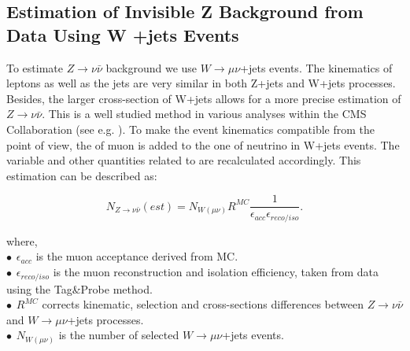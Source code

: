 \subsection{Estimation of Invisible Z Background from Data Using W +jets Events}
\label{sect:znunu}
To estimate $Z\rightarrow\nu\bar{\nu}$ background we use $W\rightarrow\mu\nu$+jets events. The kinematics of leptons as well as the jets are very similar in both Z+jets and W+jets processes. Besides, the larger cross-section of W+jets allows for a more precise estimation of
$Z\rightarrow\nu\bar{\nu}$.  This is a well studied method in various analyses within the CMS Collaboration (see e.g. \cite{CMS-PAS-SUS-08-002,CMS-PAS-SUS-10-001,CMS-PAS-SUS-11-005}).
To make the event kinematics compatible from the \met point of view, the \pT of muon is added to the one of neutrino in W+jets events. The \mttwo variable and other quantities related to \met are recalculated accordingly.
This estimation can be described as:

\begin{linenomath}
\begin{equation}
\label{eq:ZinvEst}
N_{Z\rightarrow\nu\bar{\nu}}(est) = N_{W (\mu\nu)} R^{MC} \frac{1}{\epsilon_{acc}\epsilon_{reco/iso}}.
\end{equation}
\end{linenomath}
where,\\
$\bullet \hspace{5pt} \epsilon_{acc}$ is the muon acceptance derived from MC.\\
$\bullet \hspace{5pt} \epsilon_{reco/iso}$ is the muon reconstruction and isolation efficiency, taken from data using the Tag\&Probe method.\\
$\bullet \hspace{5pt} R^{MC}$ corrects kinematic, selection and cross-sections differences between $Z\rightarrow\nu\bar{\nu}$ and $W\rightarrow\mu\nu$+jets processes.\\
$\bullet \hspace{5pt} N_{W (\mu\nu)}$ is the number of selected $W\rightarrow\mu\nu$+jets events.\\

